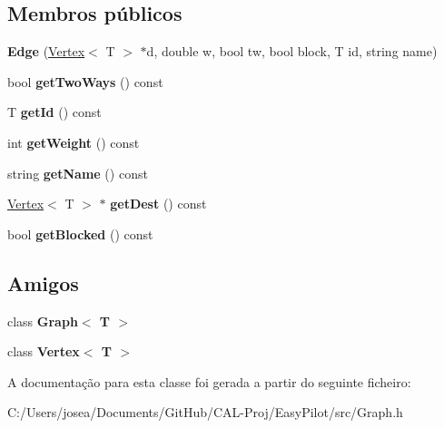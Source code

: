 \subsection*{Membros públicos}
\begin{DoxyCompactItemize}
\item 
\hypertarget{class_edge_aa83400a85aa2e50327bdc8ba854ad375}{}{\bfseries Edge} (\hyperlink{class_vertex}{Vertex}$<$ T $>$ $\ast$d, double w, bool tw, bool block, T id, string name)\label{class_edge_aa83400a85aa2e50327bdc8ba854ad375}

\item 
\hypertarget{class_edge_a330979d3f8be8f4f26889e046adf5eb2}{}bool {\bfseries get\+Two\+Ways} () const \label{class_edge_a330979d3f8be8f4f26889e046adf5eb2}

\item 
\hypertarget{class_edge_a655569c8bc3e9154d82a49ffebf0a8e6}{}T {\bfseries get\+Id} () const \label{class_edge_a655569c8bc3e9154d82a49ffebf0a8e6}

\item 
\hypertarget{class_edge_a9c0f42ab235c2c427d2239bf5419b854}{}int {\bfseries get\+Weight} () const \label{class_edge_a9c0f42ab235c2c427d2239bf5419b854}

\item 
\hypertarget{class_edge_a29153ede6a73b12918e3c05a9532cf4e}{}string {\bfseries get\+Name} () const \label{class_edge_a29153ede6a73b12918e3c05a9532cf4e}

\item 
\hypertarget{class_edge_a3805fa2e04f1e7f0495fbba6524ea823}{}\hyperlink{class_vertex}{Vertex}$<$ T $>$ $\ast$ {\bfseries get\+Dest} () const \label{class_edge_a3805fa2e04f1e7f0495fbba6524ea823}

\item 
\hypertarget{class_edge_a6b46f098c5d22a74ee404f34dd89c0eb}{}bool {\bfseries get\+Blocked} () const \label{class_edge_a6b46f098c5d22a74ee404f34dd89c0eb}

\end{DoxyCompactItemize}
\subsection*{Amigos}
\begin{DoxyCompactItemize}
\item 
\hypertarget{class_edge_aefa9b76cd57411c5354e5620dc2d84dd}{}class {\bfseries Graph$<$ T $>$}\label{class_edge_aefa9b76cd57411c5354e5620dc2d84dd}

\item 
\hypertarget{class_edge_a2e120a12dec663fa334633b4f26cbed8}{}class {\bfseries Vertex$<$ T $>$}\label{class_edge_a2e120a12dec663fa334633b4f26cbed8}

\end{DoxyCompactItemize}


A documentação para esta classe foi gerada a partir do seguinte ficheiro\+:\begin{DoxyCompactItemize}
\item 
C\+:/\+Users/josea/\+Documents/\+Git\+Hub/\+C\+A\+L-\/\+Proj/\+Easy\+Pilot/src/Graph.\+h\end{DoxyCompactItemize}

